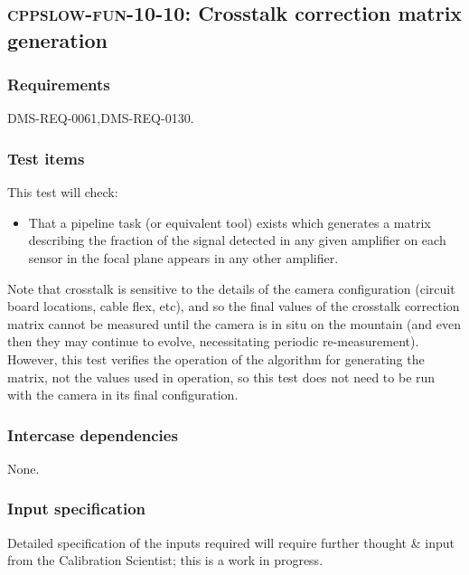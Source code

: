 \subsection{\textsc{cppslow-fun-10-10}: Crosstalk correction matrix generation}
\label{cppslow-fun-10-10}

\subsubsection{Requirements}

DMS-REQ-0061,DMS-REQ-0130.

\subsubsection{Test items}

This test will check:

\begin{itemize}

  \item{That a pipeline task (or equivalent tool) exists which generates a
  matrix describing the fraction of the signal detected in any given amplifier
  on each sensor in the focal plane appears in any other amplifier.}

\end{itemize}

Note that crosstalk is sensitive to the details of the camera configuration
(circuit board locations, cable flex, etc), and so the final values of the
crosstalk correction matrix cannot be measured until the camera is in situ on
the mountain (and even then they may continue to evolve, necessitating periodic
re-measurement). However, this test verifies the operation of the algorithm for
generating the matrix, not the values used in operation, so this test does not
need to be run with the camera in its final configuration.

\subsubsection{Intercase dependencies}

None.

\subsubsection{Input specification}

\begin{note}
Detailed specification of the inputs required will require further thought \&
input from the Calibration Scientist; this is a work in progress.
\end{note}

